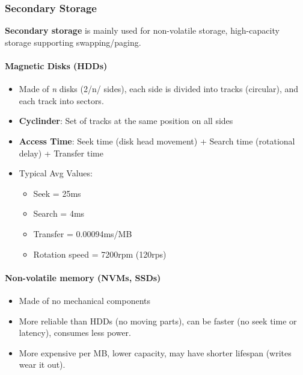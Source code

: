 \documentclass{article}%
\begin{document}
\subsubsection{Secondary Storage}
\label{sec:orgb0ff567}
\textbf{Secondary storage} is mainly used for non-volatile storage, high-capacity storage supporting swapping/paging.
\paragraph{Magnetic Disks (HDDs)}
\label{sec:orgb2f056c}
\begin{itemize}
\item Made of \emph{n} disks (2/n/ sides), each side is divided into tracks (circular), and each track into sectors.
\item \textbf{Cyclinder}: Set of tracks at the same position on all sides
\item \textbf{Access Time}: Seek time (disk head movement) + Search time (rotational delay) + Transfer time
\item Typical Avg Values: 
\begin{itemize}
\item Seek = 25ms
\item Search = 4ms
\item Transfer = 0.00094ms/MB
\item Rotation speed = 7200rpm (120rps)
\end{itemize}
\end{itemize}

\paragraph{Non-volatile memory (NVMs, SSDs)}
\label{sec:orgc85df7e}
\begin{itemize}
\item Made of no mechanical components
\item More reliable than HDDs (no moving parts), can be faster (no seek time or latency), consumes less power.
\item More expensive per MB, lower capacity, may have shorter lifespan (writes wear it out).
\end{itemize}
\end{document}
